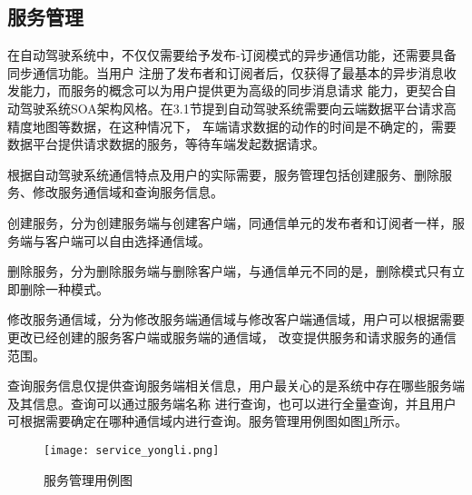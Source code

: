   
\subsection{服务管理}
在自动驾驶系统中，不仅仅需要给予发布-订阅模式的异步通信功能，还需要具备同步通信功能。当用户
注册了发布者和订阅者后，仅获得了最基本的异步消息收发能力，而服务的概念可以为用户提供更为高级的同步消息请求
能力，更契合自动驾驶系统SOA架构风格。在3.1节提到自动驾驶系统需要向云端数据平台请求高精度地图等数据，在这种情况下，
车端请求数据的动作的时间是不确定的，需要数据平台提供请求数据的服务，等待车端发起数据请求。

根据自动驾驶系统通信特点及用户的实际需要，服务管理包括创建服务、删除服务、修改服务通信域和查询服务信息。

创建服务，分为创建服务端与创建客户端，同通信单元的发布者和订阅者一样，服务端与客户端可以自由选择通信域。

删除服务，分为删除服务端与删除客户端，与通信单元不同的是，删除模式只有立即删除一种模式。

修改服务通信域，分为修改服务端通信域与修改客户端通信域，用户可以根据需要更改已经创建的服务客户端或服务端的通信域，
改变提供服务和请求服务的通信范围。

查询服务信息仅提供查询服务端相关信息，用户最关心的是系统中存在哪些服务端及其信息。查询可以通过服务端名称
进行查询，也可以进行全量查询，并且用户可根据需要确定在哪种通信域内进行查询。服务管理用例图如图\ref{service_yongli}所示。

\begin{figure}[H]
  \centering
  \texttt{[image: service\_yongli.png]}
  \caption{服务管理用例图}
  \label{service_yongli}
\end{figure}

